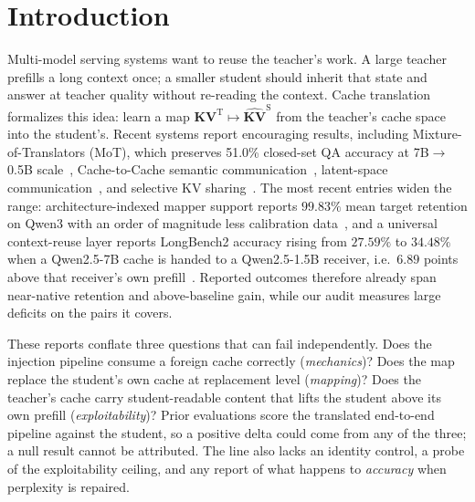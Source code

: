 \documentclass{article} %
\begin{document}
\section{Introduction}
\label{sec:intro}

Multi-model serving systems want to reuse the teacher's work. A large teacher
prefills a long context once; a smaller student should inherit that state and
answer at teacher quality without re-reading the context. Cache translation
formalizes this idea: learn a map $\mathbf{KV}^{\mathrm{T}} \mapsto
\widehat{\mathbf{KV}}^{\mathrm{S}}$ from the teacher's cache space into the
student's. Recent systems report encouraging results, including
Mixture-of-Translators (MoT), which preserves 51.0\% closed-set QA accuracy at
7B$\to$0.5B scale~\citep{mot2026}, Cache-to-Cache semantic
communication~\citep{c2c2025}, latent-space
communication~\citep{lsc2026}, and selective KV
sharing~\citep{kvcomm2025}. The most recent entries widen the range:
architecture-indexed mapper support reports $99.83\%$ mean target retention on
Qwen3 with an order of magnitude less calibration
data~\citep{cachebridge2026}, and a universal context-reuse layer reports
LongBench2 accuracy rising from $27.59\%$ to $34.48\%$ when a Qwen2.5-7B cache
is handed to a Qwen2.5-1.5B receiver, i.e.\ $6.89$ points above that
receiver's own prefill~\citep{contextreuse2026}. Reported outcomes therefore
already span near-native retention and above-baseline gain, while our audit
measures large deficits on the pairs it covers.

These reports conflate three questions that can fail independently. Does the
injection pipeline consume a foreign cache correctly (\emph{mechanics})? Does
the map replace the student's own cache at replacement level (\emph{mapping})?
Does the teacher's cache carry student-readable content that lifts the student
above its own prefill (\emph{exploitability})? Prior evaluations score the
translated end-to-end pipeline against the student, so a positive delta could
come from any of the three; a null result cannot be attributed. The line also
lacks an identity control, a probe of the exploitability ceiling, and any
report of what happens to \emph{accuracy} when perplexity is repaired.
\end{document}
